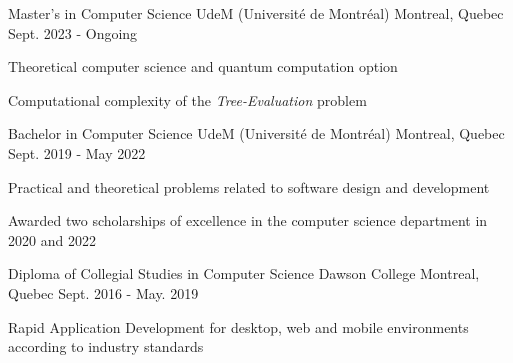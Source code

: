 

\begin{cventries}

  \cventry
    {Master's in Computer Science} %
    {UdeM (Université de Montréal)} %
    {Montreal, Quebec} %
    {Sept. 2023 - Ongoing} %
    {
      \begin{cvitems} %
        \item {Theoretical computer science and quantum computation option}
        \item {Computational complexity of the \textit{Tree-Evaluation} problem}
      \end{cvitems}
    }
    
  \cventry
    {Bachelor in Computer Science} %
    {UdeM (Université de Montréal)} %
    {Montreal, Quebec} %
    {Sept. 2019 - May 2022} %
    {
      \begin{cvitems} %
        \item {Practical and theoretical problems related to software design and development}
        \item {Awarded two scholarships of excellence in the computer science department in 2020 and 2022}
      \end{cvitems}
    }
    
  \cventry
    {Diploma of Collegial Studies in Computer Science} %
    {Dawson College} %
    {Montreal, Quebec} %
    {Sept. 2016 - May. 2019} %
    {
      \begin{cvitems} %
        \item {Rapid Application Development for desktop, web and mobile environments according to industry standards}
      \end{cvitems}
    }

\end{cventries}
